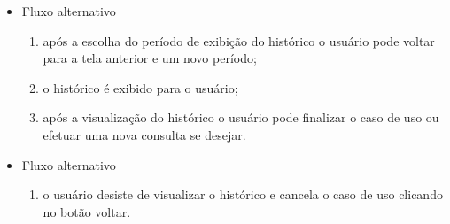 \begin{itemize}
\begin{itemize}
		    \item Fluxo alternativo
			    \begin{enumerate}
			        \item após a escolha do período de exibição do histórico o usuário pode voltar para a tela anterior e um novo período;
			        \item o histórico é exibido para o usuário;
			        \item após a visualização do histórico o usuário pode finalizar o caso de uso ou efetuar uma nova consulta se desejar.
			    \end{enumerate}

		    \item Fluxo alternativo
			    \begin{enumerate}
			        \item o usuário desiste de visualizar o histórico e cancela o caso de uso clicando no botão voltar.
			    \end{enumerate}
		\end{itemize}
\end{itemize}

\newpage

